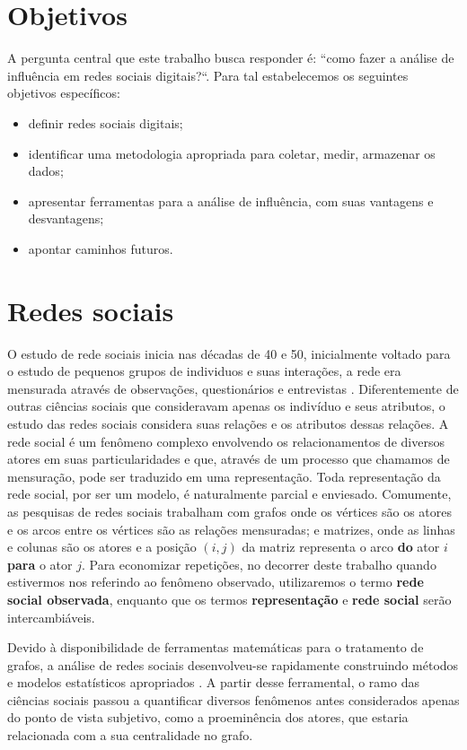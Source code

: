 \section{Objetivos}
\label{sec:objetivos}

A pergunta central que este trabalho busca responder é: ``como fazer a análise
de influência em redes sociais digitais?``. Para tal estabelecemos os seguintes
objetivos específicos:

\begin{itemize}
  \item definir redes sociais digitais;
  \item identificar uma metodologia apropriada para coletar, medir, armazenar os
  dados;
  \item apresentar ferramentas para a análise de influência, com suas vantagens
  e desvantagens;
  \item apontar caminhos futuros.
\end{itemize}

\section{Redes sociais}
\label{ch:redes}
O estudo de rede sociais inicia nas décadas de 40 e 50, inicialmente voltado para
o estudo de pequenos grupos de individuos e suas interações, a rede era mensurada
através de observações, questionários e entrevistas \citep{Wasserman}.
Diferentemente de outras ciências sociais que consideravam apenas os indivíduo e
seus atributos, o estudo das redes sociais considera suas relações e os atributos
dessas relações. A rede social é um fenômeno complexo envolvendo os
relacionamentos de diversos atores em suas particularidades e que, através de um
processo que chamamos de mensuração, pode ser traduzido em uma representação.
Toda representação da rede social, por ser um modelo, é naturalmente parcial e
enviesado. Comumente, as pesquisas de redes sociais trabalham com grafos onde os
vértices são os atores e os arcos entre os vértices são as relações mensuradas; e
matrizes, onde as linhas e colunas são os atores e a posição $(i,j)$ da matriz
representa o arco \textbf{do} ator $i$ \textbf{para} o ator $j$. Para economizar
repetições, no decorrer deste trabalho quando estivermos nos referindo ao
fenômeno observado, utilizaremos o termo \textbf{rede social observada}, enquanto
que os termos \textbf{representação} e \textbf{rede social} serão
intercambiáveis.

Devido à disponibilidade de ferramentas matemáticas para o tratamento de grafos,
a análise de redes sociais desenvolveu-se rapidamente construindo métodos e
modelos estatísticos apropriados \citep{Butts2009}. A partir desse ferramental,
o ramo das ciências sociais passou a quantificar diversos fenômenos antes
considerados apenas do ponto de vista subjetivo, como a proeminência dos atores,
que estaria relacionada com a sua centralidade no grafo.

